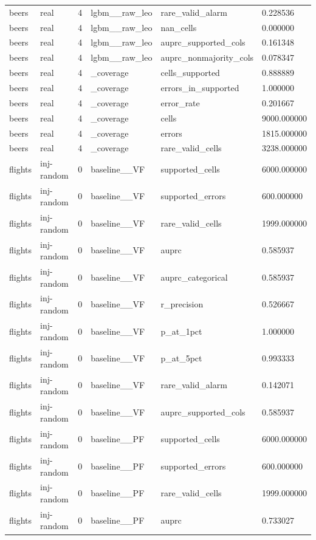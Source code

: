 \begin{tabular}{llllll}
beers & real & 4 & lgbm\_\_raw\_leo & rare\_valid\_alarm & 0.228536 \\
beers & real & 4 & lgbm\_\_raw\_leo & nan\_cells & 0.000000 \\
beers & real & 4 & lgbm\_\_raw\_leo & auprc\_supported\_cols & 0.161348 \\
beers & real & 4 & lgbm\_\_raw\_leo & auprc\_nonmajority\_cols & 0.078347 \\
beers & real & 4 & \_coverage & cells\_supported & 0.888889 \\
beers & real & 4 & \_coverage & errors\_in\_supported & 1.000000 \\
beers & real & 4 & \_coverage & error\_rate & 0.201667 \\
beers & real & 4 & \_coverage & cells & 9000.000000 \\
beers & real & 4 & \_coverage & errors & 1815.000000 \\
beers & real & 4 & \_coverage & rare\_valid\_cells & 3238.000000 \\
flights & inj-random & 0 & baseline\_\_VF & supported\_cells & 6000.000000 \\
flights & inj-random & 0 & baseline\_\_VF & supported\_errors & 600.000000 \\
flights & inj-random & 0 & baseline\_\_VF & rare\_valid\_cells & 1999.000000 \\
flights & inj-random & 0 & baseline\_\_VF & auprc & 0.585937 \\
flights & inj-random & 0 & baseline\_\_VF & auprc\_categorical & 0.585937 \\
flights & inj-random & 0 & baseline\_\_VF & r\_precision & 0.526667 \\
flights & inj-random & 0 & baseline\_\_VF & p\_at\_1pct & 1.000000 \\
flights & inj-random & 0 & baseline\_\_VF & p\_at\_5pct & 0.993333 \\
flights & inj-random & 0 & baseline\_\_VF & rare\_valid\_alarm & 0.142071 \\
flights & inj-random & 0 & baseline\_\_VF & auprc\_supported\_cols & 0.585937 \\
flights & inj-random & 0 & baseline\_\_PF & supported\_cells & 6000.000000 \\
flights & inj-random & 0 & baseline\_\_PF & supported\_errors & 600.000000 \\
flights & inj-random & 0 & baseline\_\_PF & rare\_valid\_cells & 1999.000000 \\
flights & inj-random & 0 & baseline\_\_PF & auprc & 0.733027 \\

\end{tabular}
